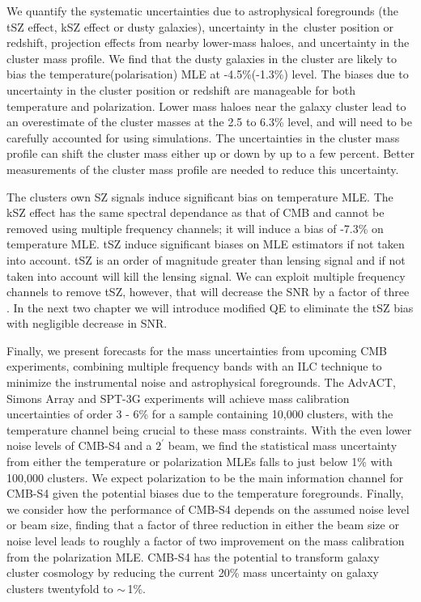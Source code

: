 We quantify the systematic uncertainties due to astrophysical foregrounds (the tSZ effect, kSZ effect or dusty galaxies), uncertainty in the\
 cluster position or redshift, projection effects from nearby lower-mass haloes, and uncertainty in the cluster mass profile. We find that the dusty galaxies in the cluster are likely to bias the temperature(polarisation) MLE at -4.5\%(-1.3\%) level.  The biases due to uncertainty in the cluster position or redshift are manageable for both temperature and polarization. Lower mass haloes near the galaxy cluster lead to an overestimate of the cluster masses at the 2.5 to 6.3\% level, and will need to be carefully accounted for using simulations.
The uncertainties in the cluster mass profile can shift the cluster mass either up or down by up to a few percent. Better measurements of the cluster mass profile are needed to reduce this uncertainty.

The clusters own SZ signals induce significant bias on temperature MLE. The kSZ effect has the same spectral dependance as that of CMB and cannot be removed using multiple frequency channels; it will induce a bias of -7.3\% on temperature MLE. tSZ induce significant biases on MLE estimators if not taken into account. tSZ is an order of magnitude greater than lensing signal and if not taken into account will kill the lensing signal. We can exploit multiple frequency channels to remove tSZ, however, that will decrease the SNR by a factor of three \citep{baxter15}. In the next two chapter we will introduce modified QE to eliminate the tSZ bias with negligible decrease in SNR. 

Finally, we present forecasts for the mass uncertainties from upcoming CMB experiments,  combining multiple frequency bands with an ILC technique to minimize the instrumental noise and astrophysical foregrounds. The AdvACT, Simons Array and SPT-3G experiments will achieve mass calibration uncertainties of order 3 - 6\% for a sample containing 10,000 clusters, with the temperature channel being crucial to these mass constraints. With the even lower noise levels of CMB-S4 and a $2^\prime$ beam, we find the statistical mass uncertainty from either the temperature or polarization MLEs falls to just below 1\% with 100,000 clusters. We expect polarization to be the main information channel for CMB-S4 given the potential biases  due to the temperature foregrounds. Finally, we consider how the performance of CMB-S4 depends on the assumed noise level or beam size, finding that a factor of three reduction in either the beam size or noise level leads to roughly a factor of two improvement on the mass calibration from the polarization MLE. CMB-S4 has the potential to transform galaxy cluster cosmology by reducing the current 20\% mass uncertainty on galaxy clusters twentyfold to $\sim$\,1\%.



